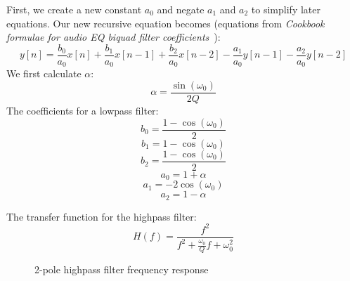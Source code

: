 \documentclass[11pt,a4paper]{article}
\begin{document}
First, we create a new constant $a_0$ and negate $a_1$ and $a_2$ to simplify later equations. Our new recursive equation becomes (equations from \emph{Cookbook formulae for audio EQ biquad filter coefficients}~\cite{Cookbook}):
\begin{equation}
y[n] = \frac{b_0}{a_0}x[n] + \frac{b_1}{a_0}x[n-1] + \frac{b_2}{a_0}x[n-2] - \frac{a_1}{a_0}y[n-1] - \frac{a_2}{a_0}y[n-2]
\end{equation}
We first calculate $\alpha$:
\begin{equation}
\alpha = \frac{\sin(\omega_0)}{2Q}
\end{equation}
The coefficients for a lowpass filter:
\begin{equation}
b_0 = \frac{1 - \cos(\omega_0)}{2}
\end{equation}
\begin{equation}
b_1 = 1 - \cos(\omega_0)
\end{equation}
\begin{equation}
b_2 = \frac{1 - \cos(\omega_0)}{2}
\end{equation}
\begin{equation}
a_0 = 1 + \alpha
\end{equation}
\begin{equation}
a_1 = -2\cos(\omega_0)
\end{equation}
\begin{equation}
a_2 = 1 - \alpha
\end{equation}

The transfer function for the highpass filter:
\begin{equation}
H(f) = \frac{f^2}{f^2 + \frac{\omega_0}{Q}f + \omega_0^2}
\end{equation}


\begin{figure}[ht]
\caption{2-pole highpass filter frequency response}
\centering
{}

\end{figure}
\end{document}
